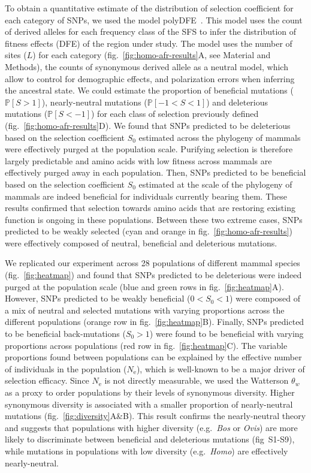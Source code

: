 \documentclass{article}
\newcommand{\Ne}{N_{\textrm{e}}}
\newcommand{\proba}{\mathbb{P}}
\newcommand{\Sphy}{S_{0}}
\newcommand{\divWeakAdv}{0 < \Sphy < 1}
\newcommand{\divAdv}{ \Sphy > 1}
\newcommand{\Spop}{S}
\newcommand{\polyDel}{\Spop < -1}
\newcommand{\polyNeutral}{-1 < \Spop < 1}
\newcommand{\polyAdv}{ \Spop > 1}
\newcommand{\PpolyDel}{\proba \left[ \polyDel \right]}
\newcommand{\PpolyNeutral}{\proba \left[ \polyNeutral \right]}
\newcommand{\PpolyAdv}{\proba \left[ \polyAdv \right]}
\begin{document}
    To obtain a quantitative estimate of the distribution of selection coefficient for each category of SNPs, we used the model polyDFE~\cite{tataru_inference_2017, tataru_polydfe_2020}.
    This model uses the count of derived alleles for each frequency class of the SFS to infer the distribution of fitness effects (DFE) of the region under study.
    The model uses the number of sites ($L$) for each category (fig.~\ref{fig:homo-afr-results}A, see Material and Methods), the counts of synonymous derived allele as a neutral model, which allow to control for demographic effects, and polarization errors when inferring the ancestral state.
    We could estimate the proportion of beneficial mutations ($\PpolyAdv$), nearly-neutral mutations ($\PpolyNeutral$) and deleterious mutations ($\PpolyDel$) for each class of selection previously defined (fig.~\ref{fig:homo-afr-results}D).
    We found that SNPs predicted to be deleterious based on the selection coefficient $\Sphy$ estimated across the phylogeny of mammals were effectively purged at the population scale.
    Purifying selection is therefore largely predictable and amino acids with low fitness across mammals are effectively purged away in each population.
    Then, SNPs predicted to be beneficial based on the selection coefficient $\Sphy$ estimated at the scale of the phylogeny of mammals are indeed beneficial for individuals currently bearing them.
    These results confirmed that selection towards amino acids that are restoring existing function is ongoing in these populations.
    Between these two extreme cases, SNPs predicted to be weakly selected (cyan and orange in fig.~\ref{fig:homo-afr-results}) were effectively composed of neutral, beneficial and deleterious mutations.

    We replicated our experiment across 28 populations of different mammal species (fig.~\ref{fig:heatmap}) and found that SNPs predicted to be deleterious were indeed purged at the population scale (blue and green rows in fig.~\ref{fig:heatmap}A).
    However, SNPs predicted to be weakly beneficial ($\divWeakAdv$) were composed of a mix of neutral and selected mutations with varying proportions across the different populations (orange row in fig.~\ref{fig:heatmap}B).
    Finally, SNPs predicted to be beneficial back-mutations ($\divAdv$) were found to be beneficial with varying proportions across populations (red row in fig.~\ref{fig:heatmap}C).
    The variable proportions found between populations can be explained by the effective number of individuals in the population ($\Ne$), which is well-known to be a major driver of selection efficacy.
    Since $\Ne$ is not directly measurable, we used the Watterson $\theta_w$ as a proxy to order populations by their levels of synonymous diversity.
    Higher synonymous diversity is associated with a smaller proportion of nearly-neutral mutations (fig.~\ref{fig:diversity}A\&B).
    This result confirms the nearly-neutral theory and suggests that populations with higher diversity (e.g.~\textit{Bos} or \textit{Ovis}) are more likely to discriminate between beneficial and deleterious mutations (fig~S1-S9), while mutations in populations with low diversity (e.g.~\textit{Homo}) are effectively nearly-neutral.
\end{document}
